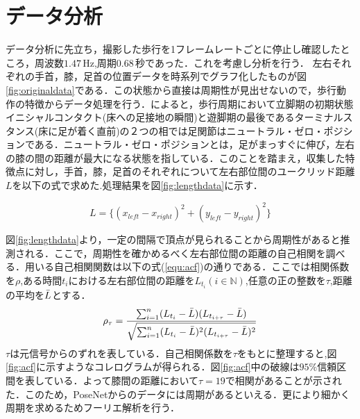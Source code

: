 \documentclass[a4j,10.5pt]{jreport}
\begin{document}
\newpage
\section{データ分析}
データ分析に先立ち，撮影した歩行を1フレームレートごとに停止し確認したところ，周波数$1.47\,\mathrm{Hz}$,周期$0.68\,\mathrm{秒}$であった．これを考慮し分析を行う．
左右それぞれの手首，膝，足首の位置データを時系列でグラフ化したものが図\ref{fig:originaldata}である．この状態から直接は周期性が見出せないので，歩行動作の特徴からデータ処理を行う．\cite{gait_analyse}によると，歩行周期において立脚期の初期状態イニシャルコンタクト(床への足接地の瞬間)と遊脚期の最後であるターミナルスタンス(床に足が着く直前)の２つの相では足関節はニュートラル・ゼロ・ポジションである．ニュートラル・ゼロ・ポジションとは，足がまっすぐに伸び，左右の膝の間の距離が最大になる状態を指している．このことを踏まえ，収集した特徴点に対し，手首，膝，足首のそれぞれについて左右部位間のユークリッド距離$L$を以下の式で求めた.処理結果を図\ref{fig:lengthdata}に示す．

\begin{equation}
  L = \{(x_{left} - x_{right})^2 + (y_{left} - y_{right})^2\}
\end{equation}

図\ref{fig:lengthdata}より，一定の間隔で頂点が見られることから周期性があると推測される．ここで，周期性を確かめるべく左右部位間の距離の自己相関を調べる．用いる自己相関関数は以下の式(\ref{equ:acf})の通りである．ここでは相関係数を$\rho$,ある時間$t_i$における左右部位間の距離を$L_{t_i}(i\in \mathbb{N})$,任意の正の整数を$\tau$,距離の平均を$\Bar{L}$とする．
\begin{equation}\label{equ:acf}
    \rho_\tau = \frac{\sum_{i=1}^{n}(L_{t_i}-\Bar{L})(L_{t_{i+\tau}}-\Bar{L})}
    {\sqrt{\sum_{i=1}^{n}(L_{t_{i}}-\Bar{L})^2(L_{t_{i+\tau}}-\Bar{L})^2}}
\end{equation}
$\tau$は元信号からのずれを表している．自己相関係数を$\tau$をもとに整理すると,図\ref{fig:acf}に示すようなコレログラムが得られる．図\ref{fig:acf}中の破線は$95\%$信頼区間を表している．よって膝間の距離において$\tau=19$で相関があることが示された．このため，PoseNetからのデータには周期があるといえる．更により細かく周期を求めるためフーリエ解析を行う．
\newpage
\end{document}

